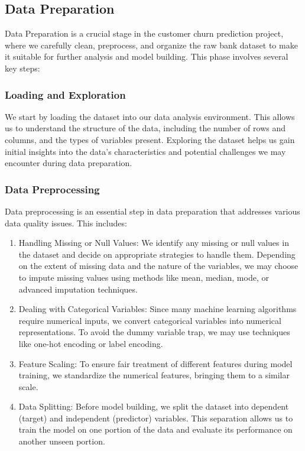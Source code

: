 \documentclass{article}
\begin{document}
\begin{multicols}{2}
\subsection{Data Preparation}
Data Preparation is a crucial stage in the customer churn prediction project, where we carefully clean, preprocess, and organize the raw bank dataset to make it suitable for further analysis and model building. This phase involves several key steps: 

\subsubsection{Loading and Exploration}

We start by loading the dataset into our data analysis environment. This allows us to understand the structure of the data, including the number of rows and columns, and the types of variables present. Exploring the dataset helps us gain initial insights into the data's characteristics and potential challenges we may encounter during data preparation.

\subsubsection{Data Preprocessing}

Data preprocessing is an essential step in data preparation that addresses various data quality issues. This includes:

\begin{enumerate}
    \item Handling Missing or Null Values: We identify any missing or null values in the dataset and decide on appropriate strategies to handle them. Depending on the extent of missing data and the nature of the variables, we may choose to impute missing values using methods like mean, median, mode, or advanced imputation techniques.
    \item Dealing with Categorical Variables: Since many machine learning algorithms require numerical inputs, we convert categorical variables into numerical representations. To avoid the dummy variable trap, we may use techniques like one-hot encoding or label encoding.
    \item Feature Scaling: To ensure fair treatment of different features during model training, we standardize the numerical features, bringing them to a similar scale.
    \item Data Splitting: Before model building, we split the dataset into dependent (target) and independent (predictor) variables. This separation allows us to train the model on one portion of the data and evaluate its performance on another unseen portion.
\end{enumerate}


\end{multicols}
\end{document}
